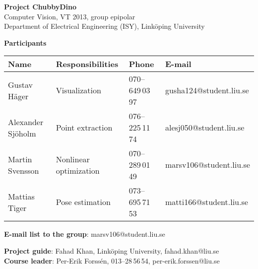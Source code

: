 \begin{center}
    \vspace*{4\baselineskip}

	\textbf{\huge Project ChubbyDino} \\
	\vspace*{0.5\baselineskip}
	Computer Vision, VT 2013, group epipolar \\
	Department of Electrical Engineering (ISY), Link\"{o}ping University
	
	\vspace*{2\baselineskip}
	\textbf{\LARGE Participants}


	{\footnotesize 
	\begin{tabular}{|p{2.7cm}|p{5cm}|p{2cm}|p{3.4cm}|}
		\hline
			\textbf{Name} & \textbf{Responsibilities} & \textbf{Phone} & \textbf{E-mail} \\
		\hline
		Gustav Häger & Visualization & 070--649\,03\,97 & gusha124@student.liu.se \\
		\hline
		Alexander Sjöholm & Point extraction & 076--225\,11\,74 & alesj050@student.liu.se \\
		\hline
		Martin Svensson & Nonlinear optimization & 070--289\,01\,49 & marsv106@student.liu.se \\
		\hline
		Mattias Tiger & Pose estimation & 073--695\,71\,53 & matti166@student.liu.se \\
		\hline
	\end{tabular}
	}

{\footnotesize 
\textbf{E-mail list to the group}: marsv106@student.liu.se \\
\vspace{1\baselineskip}

\textbf{Project guide}: Fahad Khan, Link\"{o}ping University, fahad.khan@liu.se \\
\textbf{Course leader}: Per-Erik Forssén, 013--28\,56\,54, per-erik.forssen@liu.se \\
}

\end{center}
